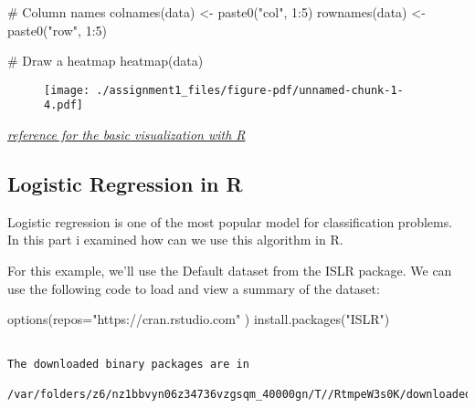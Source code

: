 \documentclass[
  letterpaper,
  DIV=11,
  numbers=noendperiod]{scrreprt}
\newenvironment{Shaded}{\begin{snugshade}}{\end{snugshade}}
\newcommand{\AttributeTok}[1]{\textcolor[rgb]{0.40,0.45,0.13}{#1}}
\newcommand{\CommentTok}[1]{\textcolor[rgb]{0.37,0.37,0.37}{#1}}
\newcommand{\DecValTok}[1]{\textcolor[rgb]{0.68,0.00,0.00}{#1}}
\newcommand{\FunctionTok}[1]{\textcolor[rgb]{0.28,0.35,0.67}{#1}}
\newcommand{\NormalTok}[1]{\textcolor[rgb]{0.00,0.23,0.31}{#1}}
\newcommand{\OtherTok}[1]{\textcolor[rgb]{0.00,0.23,0.31}{#1}}
\newcommand{\SpecialCharTok}[1]{\textcolor[rgb]{0.37,0.37,0.37}{#1}}
\newcommand{\StringTok}[1]{\textcolor[rgb]{0.13,0.47,0.30}{#1}}
\begin{document}
\begin{Shaded}
\begin{Highlighting}[]
\CommentTok{\# Column names}
\FunctionTok{colnames}\NormalTok{(data) }\OtherTok{\textless{}{-}} \FunctionTok{paste0}\NormalTok{(}\StringTok{"col"}\NormalTok{, }\DecValTok{1}\SpecialCharTok{:}\DecValTok{5}\NormalTok{)}
\FunctionTok{rownames}\NormalTok{(data) }\OtherTok{\textless{}{-}} \FunctionTok{paste0}\NormalTok{(}\StringTok{"row"}\NormalTok{, }\DecValTok{1}\SpecialCharTok{:}\DecValTok{5}\NormalTok{)}
  
\CommentTok{\# Draw a heatmap}
\FunctionTok{heatmap}\NormalTok{(data)     }
\end{Highlighting}
\end{Shaded}

\begin{figure}[H]

{\centering \texttt{[image: ./assignment1\_files/figure-pdf/unnamed-chunk-1-4.pdf]}

}

\end{figure}

\href{https://www.geeksforgeeks.org/data-visualization-in-r}{\emph{reference
for the basic visualization with R}}

\hypertarget{logistic-regression-in-r}{%
\subsection{Logistic Regression in R}\label{logistic-regression-in-r}}

Logistic regression is one of the most popular model for classification
problems. In this part i examined how can we use this algorithm in R.

For this example, we'll use the Default dataset from the ISLR package.
We can use the following code to load and view a summary of the dataset:

\begin{Shaded}
\begin{Highlighting}[]
\FunctionTok{options}\NormalTok{(}\AttributeTok{repos=}\StringTok{"https://cran.rstudio.com"}\NormalTok{ )}
\FunctionTok{install.packages}\NormalTok{(}\StringTok{"ISLR"}\NormalTok{)}
\end{Highlighting}
\end{Shaded}

\begin{verbatim}

The downloaded binary packages are in
    /var/folders/z6/nz1bbvyn06z34736vzgsqm_40000gn/T//RtmpeW3s0K/downloaded_packages
\end{verbatim}
\end{document}
